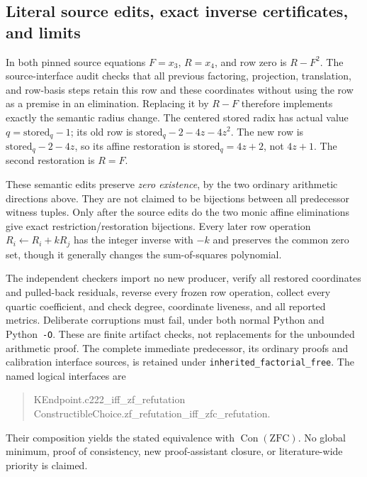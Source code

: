 \subsection{Literal source edits, exact inverse certificates, and limits}
In both pinned source equations $F=x_3$, $R=x_4$, and row zero is
$R-F^2$.  The source-interface audit checks that all previous factoring,
projection, translation, and row-basis steps retain this row and these
coordinates without using the row as a premise in an elimination.
Replacing it by $R-F$ therefore implements exactly the semantic radius
change.  The centered stored radix has actual value
$q=\text{stored}_q-1$; its old row is
$\text{stored}_q-2-4z-4z^2$.  The new row is
$\text{stored}_q-2-4z$, so its affine restoration is
$\text{stored}_q=4z+2$, not $4z+1$.
The second restoration is $R=F$.

These semantic edits preserve \emph{zero existence}, by the two ordinary
arithmetic directions above.  They are not claimed to be bijections
between all predecessor witness tuples.  Only after the source edits do
the two monic affine eliminations give exact restriction/restoration
bijections.  Every later row operation $R_i\leftarrow R_i+kR_j$ has the
integer inverse with $-k$ and preserves the common zero set, though it
generally changes the sum-of-squares polynomial.

The independent checkers import no new producer, verify all restored
coordinates and pulled-back residuals, reverse every frozen row operation,
collect every quartic coefficient, and check degree, coordinate liveness,
and all reported metrics.  Deliberate corruptions must fail, under both
normal Python and Python~\texttt{-O}.  These are finite artifact checks,
not replacements for the unbounded arithmetic proof.
The complete immediate predecessor, its ordinary proofs and calibration
interface sources, is retained under \texttt{inherited\_factorial\_free}.
The named logical interfaces are
\begin{quote}\small\ttfamily
KEndpoint.c222\_iff\_zf\_refutation\\
ConstructibleChoice.zf\_refutation\_iff\_zfc\_refutation.
\end{quote}
Their composition yields the stated equivalence with $\operatorname{Con}(\mathrm{ZFC})$.
No global minimum, proof of consistency, new proof-assistant closure, or
literature-wide priority is claimed.
